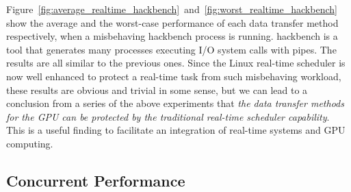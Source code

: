 Figure~\ref{fig:average_realtime_hackbench}~and~\ref{fig:worst_realtime_hackbench}
show the average and the worst-case performance of each data transfer
method respectively, when a misbehaving \textsf{hackbench} process is running.
\textsf{hackbench} is a tool that generates many processes executing I/O
system calls with pipes.
The results are all similar to the previous ones.
Since the Linux real-time scheduler is now well enhanced to protect a
real-time task from such misbehaving workload, these results are obvious
and trivial in some sense, but we can lead to a conclusion from a series
of the above experiments that \textit{the data transfer methods for the
GPU can be protected by the traditional real-time scheduler capability}.
This is a useful finding to facilitate an integration of real-time
systems and GPU computing.

\subsection{Concurrent Performance}

